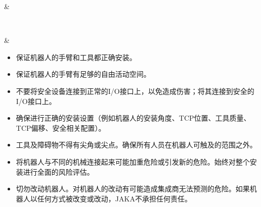 \documentclass[a4paper,11pt,english,openany,oneside]{sphinxmanual}
\renewcommand{\sphinxstyletheadfamily}{
\color{white}\bfseries
}
\begin{document}
\begin{savenotes}\sphinxattablestart
\sphinxthistablewithglobalstyle
\centering
{}
\sphinxthecaptionisattop
{}\label{\detokenize{05 _u5b89_u5168_u89c4_u8303:id17}}
\sphinxaftertopcaption
\begin{tabular}[t]{}
\sphinxtoprule
\begin{varwidth}[t]{}
\sphinxstyletheadfamily \sphinxAtStartPar
{}
\sphinxbeforeendvarwidth
\end{varwidth}%
&\begin{varwidth}[t]{}
\sphinxstyletheadfamily \sphinxAtStartPar
{}
\sphinxbeforeendvarwidth
\end{varwidth}%
\\
\sphinxmidrule
\sphinxtableatstartofbodyhook\begin{varwidth}[t]{}

\noindent{}
\sphinxbeforeendvarwidth
\end{varwidth}%
&\begin{varwidth}[t]{}
\sphinxAtStartPar
{}
\begin{itemize}
\item {} 
\sphinxAtStartPar
保证机器人的手臂和工具都正确安装。

\item {} 
\sphinxAtStartPar
保证机器人的手臂有足够的自由活动空间。

\item {} 
\sphinxAtStartPar
不要将安全设备连接到正常的I/O接口上，以免造成伤害；将其连接到安全的I/O接口上。

\item {} 
\sphinxAtStartPar
确保进行正确的安装设置（例如机器人的安装角度、TCP位置、工具质量、TCP偏移、安全相关配置）。

\item {} 
\sphinxAtStartPar
工具及障碍物不得有尖角或尖点。确保所有人员在机器人可触及的范围之外。

\item {} 
\sphinxAtStartPar
将机器人与不同的机械连接起来可能加重危险或引发新的危险。始终对整个安装进行全面的风险评估。

\item {} 
\sphinxAtStartPar
切勿改动机器人。对机器人的改动有可能造成集成商无法预测的危险。如果机器人以任何方式被改变或改动，JAKA不承担任何责任。

\end{itemize}
\sphinxbeforeendvarwidth
\end{varwidth}%
\\
\sphinxbottomrule
\end{tabular}
\sphinxtableafterendhook\par
\sphinxattableend\end{savenotes}
\end{document}
